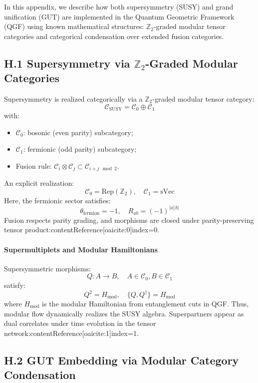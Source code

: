 \documentclass[11pt]{article}
\begin{document}
In this appendix, we describe how both supersymmetry (SUSY) and grand unification (GUT) are implemented in the Quantum Geometric Framework (QGF) using known mathematical structures: \( \mathbb{Z}_2 \)-graded modular tensor categories and categorical condensation over extended fusion categories.

\subsection*{H.1 Supersymmetry via \( \mathbb{Z}_2 \)-Graded Modular Categories}

Supersymmetry is realized categorically via a \( \mathbb{Z}_2 \)-graded modular tensor category:
\[
\mathcal{C}_{\text{SUSY}} = \mathcal{C}_0 \oplus \mathcal{C}_1
\]
with:
\begin{itemize}
  \item \( \mathcal{C}_0 \): bosonic (even parity) subcategory;
  \item \( \mathcal{C}_1 \): fermionic (odd parity) subcategory;
  \item Fusion rule: \( \mathcal{C}_i \otimes \mathcal{C}_j \subset \mathcal{C}_{i+j \mod 2} \).
\end{itemize}

An explicit realization:
\[
\mathcal{C}_0 = \text{Rep}(\mathbb{Z}_2), \quad \mathcal{C}_1 = \text{sVec}
\]
Here, the fermionic sector satisfies:
\[
\theta_{\text{fermion}} = -1, \quad R_{ab} = (-1)^{|a||b|}
\]
Fusion respects parity grading, and morphisms are closed under parity-preserving tensor product:contentReference[oaicite:0]{index=0}.

\paragraph{Supermultiplets and Modular Hamiltonians}

Supersymmetric morphisms:
\[
Q: A \rightarrow B, \quad A \in \mathcal{C}_0, B \in \mathcal{C}_1
\]
satisfy:
\[
Q^2 = H_{\text{mod}}, \quad \{Q, Q^\dagger\} = H_{\text{mod}}
\]
where \( H_{\text{mod}} \) is the modular Hamiltonian from entanglement cuts in QGF. Thus, modular flow dynamically realizes the SUSY algebra. Superpartners appear as dual correlates under time evolution in the tensor network:contentReference[oaicite:1]{index=1}.

\subsection*{H.2 GUT Embedding via Modular Category Condensation}
\end{document}
